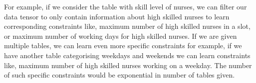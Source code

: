 \documentclass{article}
\begin{document}
For example, if we consider the table with skill level of nurses, we can filter our data tensor to only contain information about high skilled nurses to learn corresponding constraints like, maximum number of high skilled nurses in a slot, or maximum number of working days for high skilled nurses. If we are given multiple tables, we can learn even more specific constraints for example, if we have another table categorising weekdays and weekends we can learn constraints like, maximum number of high skilled nurses working on a weekday. The number of such specific constraints would be exponential in number of tables given.

\end{document}
